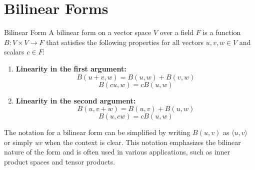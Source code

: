 \documentclass[openany]{book}
\begin{document}
\section{Bilinear Forms}
\begin{mydefinition}{Bilinear Form}
A bilinear form on a vector space $V$ over a field $F$ is a function $B: V \times V \to F$ that satisfies the following properties for all vectors $u, v, w \in V$ and scalars $c \in F$:
\begin{enumerate}
    \item \textbf{Linearity in the first argument:} 
    $$B(u + v, w) = B(u, w) + B(v, w)$$
    $$B(cu, w) = cB(u, w)$$
    \item \textbf{Linearity in the second argument:} 
    $$B(u, v + w) = B(u, v) + B(u, w)$$
    $$B(u, cw) = cB(u, w)$$
\end{enumerate}
\end{mydefinition}
\begin{mynote}
    The notation for a bilinear form can be simplified by writing $B(u, v)$ as $\langle u, v \rangle$ or simply $uv$ when the context is clear. This notation emphasizes the bilinear nature of the form and is often used in various applications, such as inner product spaces and tensor products.
\end{mynote}
\end{document}

